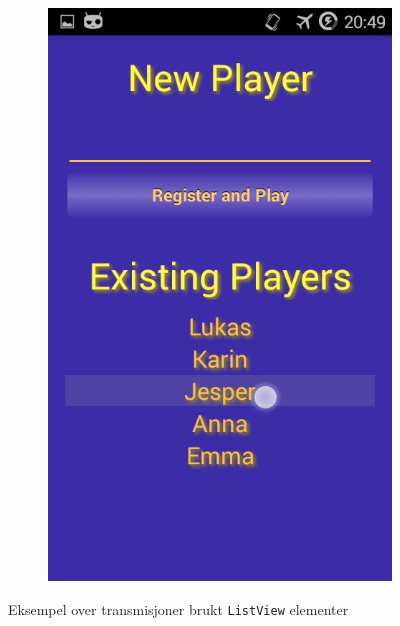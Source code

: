 \begin{figure}[float]
\begin{subfigure}[b]{0.25\textwidth}
        \includegraphics[width=\textwidth]{./img/design/d2.png}
    \end{subfigure}
    \caption{Eksempel over transmisjoner brukt \texttt{ListView} elementer}
    \label{fig:design_trans}
\end{figure}


